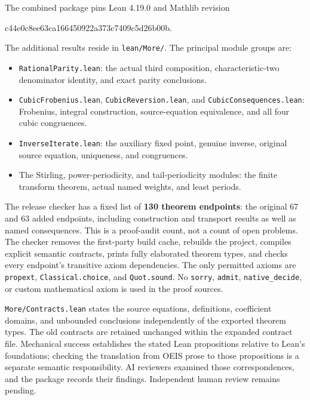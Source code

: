 \documentclass[11pt,a4paper]{article}
\theoremstyle{remark}
\begin{document}
The combined package pins Lean 4.19.0 and Mathlib revision
\begin{center}\small\ttfamily
c44e0c8ee63ca166450922a373c7409c5d26b00b.
\end{center}
The additional results reside in \texttt{lean/More/}. The principal
module groups are:
\begin{itemize}
\item \texttt{RationalParity.lean}: the actual third composition,
characteristic-two denominator identity, and exact parity conclusions.
\item \texttt{CubicFrobenius.lean}, \texttt{CubicReversion.lean}, and
\texttt{CubicConsequences.lean}: Frobenius, integral construction,
source-equation equivalence, and all four cubic congruences.
\item \texttt{InverseIterate.lean}: the auxiliary fixed point,
genuine inverse, original source equation, uniqueness, and congruences.
\item The Stirling, power-periodicity, and tail-periodicity modules:
the finite transform theorem, actual named weights, and least periods.
\end{itemize}

The release checker has a fixed list of \textbf{130 theorem endpoints}:
the original 67 and 63 added endpoints, including construction and
transport results as well as named consequences. This is a proof-audit
count, not a count of open problems. The checker removes the first-party
build cache, rebuilds the project, compiles explicit semantic contracts,
prints fully elaborated theorem types, and checks every endpoint's
transitive axiom dependencies. The only permitted axioms are
\texttt{propext}, \texttt{Classical.choice}, and \texttt{Quot.sound}.
No \texttt{sorry}, \texttt{admit}, \texttt{native\_decide}, or custom
mathematical axiom is used in the proof sources.

\texttt{More/Contracts.lean} states the source equations, definitions,
coefficient domains, and unbounded conclusions independently of the
exported theorem types. The old contracts are retained unchanged within
the expanded contract file. Mechanical success establishes the stated
Lean propositions relative to Lean's foundations; checking the
translation from OEIS prose to those propositions is a separate
semantic responsibility. AI reviewers examined those correspondences,
and the package records their findings. Independent human review
remains pending.
\end{document}
